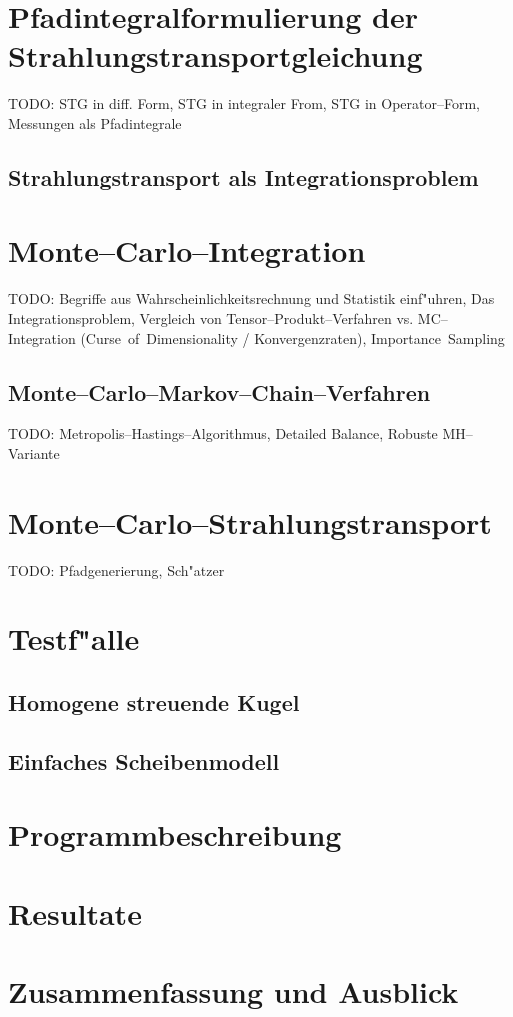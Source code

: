 \documentclass[11pt,a4paper,DIVcalc,BCOR8mm,titlepage,twoside]{scrartcl}
\begin{document}
	\section{Pfadintegralformulierung der Strahlungstransportgleichung}
	TODO: STG in diff. Form, STG in integraler From, STG in Operator--Form, Messungen als Pfadintegrale
	\subsection{Strahlungstransport als Integrationsproblem}
	\section{Monte--Carlo--Integration}
	TODO: Begriffe aus Wahrscheinlichkeitsrechnung und Statistik einf"uhren, Das Integrationsproblem, Vergleich von Tensor--Produkt--Verfahren vs. MC--Integration (Curse~of~Dimensionality / Konvergenzraten), Importance~Sampling

	\subsection{Monte--Carlo--Markov--Chain--Verfahren}
	TODO: Metropolis--Hastings--Algorithmus, Detailed Balance, Robuste MH--Variante

	\section{Monte--Carlo--Strahlungstransport}
	TODO: Pfadgenerierung, Sch"atzer
	
	\section{Testf"alle}
	\subsection{Homogene streuende Kugel}
	\subsection{Einfaches Scheibenmodell}
	
	\section{Programmbeschreibung}
	\section{Resultate}
	\section{Zusammenfassung und Ausblick}

	
	
\end{document}
